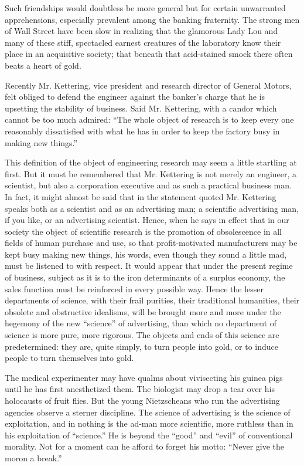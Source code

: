 \documentclass[twoside,nohyper,openany,nobib]{tufte-book}
\begin{document}
Such friendships would doubtless be more general but for certain
unwarranted apprehensions, especially prevalent among the banking
fraternity. The strong men of Wall Street have been slow in realizing
that the glamorous Lady Lou and many of these stiff, spectacled earnest
creatures of the laboratory know their place in an acquisitive society;
that beneath that acid-stained smock there often beats a heart of gold.

Recently Mr. Kettering, vice president and research director of General
Motors, felt obliged to defend the engineer against the banker's charge
that he is upsetting the stability of business. Said Mr. Kettering, with
a candor which cannot be too much admired: ``The whole object of
research is to keep every one reasonably dissatisfied with what he has
in order to keep the factory busy in making new things.''

This definition of the object of engineering research may seem a little
startling at first. But it must be remembered that Mr. Kettering is not
merely an engineer, a scientist, but also a corporation executive and as
such a practical business man. In fact, it might almost be said that in
the statement quoted Mr. Kettering speaks both as a scientist and as an
advertising man; a scientific advertising man, if you like, or an
advertising scientist. Hence, when he says in effect that in our society
the object of scientific research is the promotion of obsolescence in
all fields of human purchase and use, so that profit-motivated
manufacturers may be kept busy making new things, his words, even though
they sound a little mad, must be listened to with respect. It would
appear that under the present regime of business, subject as it is to
the iron determinants of a surplus economy, the sales function must be
reinforced in every possible way. Hence the lesser departments of
science, with their frail purities, their traditional humanities, their
obsolete and obstructive idealisms, will be brought more and more under
the hegemony of the new ``science'' of advertising, than which no
department of science is more pure, more rigorous. The objects and ends
of this science are predetermined: they are, quite simply, to turn
people into gold, or to induce people to turn themselves into gold.

The medical experimenter may have qualms about vivisecting his guinea
pigs until he has first anesthetized them. The biologist may drop a tear
over his holocausts of fruit flies. But the young Nietzscheans who run
the advertising agencies observe a sterner discipline. The science of
advertising is the science of exploitation, and in nothing is the ad-man
more scientific, more ruthless than in his exploitation of ``science.''
He is beyond the ``good'' and ``evil'' of conventional morality. Not for
a moment can he afford to forget his motto: ``Never give the moron a
break.''
\end{document}
